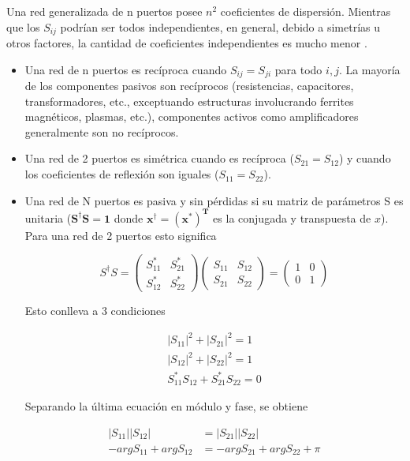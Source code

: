 Una red generalizada de n puertos posee $n^2$ coeficientes de dispersión. Mientras que los $S_{ij}$ podrían ser todos independientes,
en general, debido a simetrías u otros factores, la cantidad de coeficientes independientes es mucho menor \cite{Caspers}.
\begin{itemize}
	\item Una red de n puertos es recíproca cuando $S_{ij} = S_{ji}$ para todo $i, j$. La mayoría de los componentes pasivos son
		recíprocos (resistencias, capacitores, transformadores, etc., exceptuando estructuras involucrando ferrites magnéticos,
		plasmas, etc.), componentes activos como amplificadores generalmente son no recíprocos.
	\item Una red de 2 puertos es simétrica cuando es recíproca ($S_{21} = S_{12}$) y cuando los coeficientes de reflexión son iguales
		($S_{11} = S_{22}$).
	\item Una red de N puertos es pasiva y sin pérdidas si su matriz de parámetros S es unitaria ($\mathbf{S^{\dagger}S = 1}$ donde
		$\mathbf{x^{\dagger} = (x^*)^T}$ es la conjugada y transpuesta de $x$). Para una red de 2 puertos esto significa

\begin{equation}
S^{\dagger}S = \begin{pmatrix} S_{11}^* & S_{21}^*\\S_{12}^* & S_{22}^* \end{pmatrix}
			\begin{pmatrix} S_{11} & S_{12}\\S_{21} & S_{22} \end{pmatrix} = \begin{pmatrix} 1 & 0\\0 & 1 \end{pmatrix}
\end{equation}

Esto conlleva a 3 condiciones

\begin{equation}
\begin{aligned}
	|S_{11}|^2 + |S_{21}|^2 = 1 \\
	|S_{12}|^2 + |S_{22}|^2 = 1 \\
	S_{11}^*S_{12} + S_{21}^*S_{22} = 0
\end{aligned}
\label{eq:sCondition}
\end{equation}

Separando la última ecuación en módulo y fase, se obtiene

\begin{equation}
\begin{aligned}
	|S_{11}||S_{12}| &= |S_{21}||S_{22}| \\
	-argS_{11} + argS_{12} &= -argS_{21} + argS_{22} + \pi
\end{aligned}
\label{eq:con}
\end{equation}


\end{itemize}
